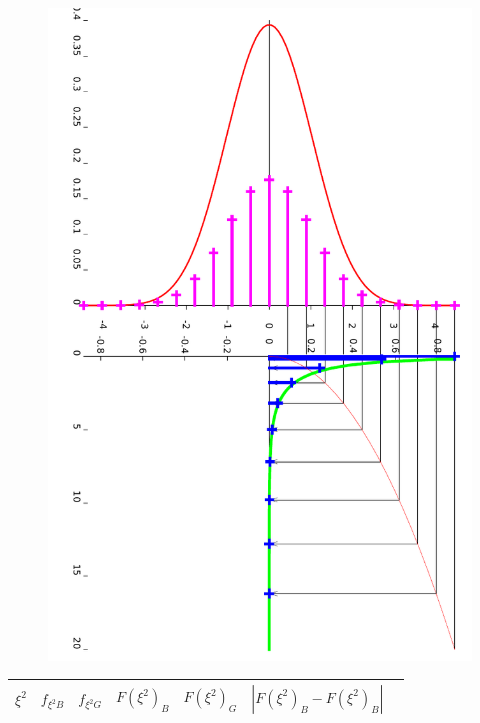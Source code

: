 \documentclass[a4paper,12pt]{article}
\begin{document}
\begin{figure}[h!]
\centering
\includegraphics[angle=90, width=\textwidth]{plot.pdf}
\end{figure}



\begin{longtable}{|c|c|c|c|c|c|c|}
\hline
$\xi^2$ & $f_{\xi^2B}$ & $f_{\xi^2G}$ & $F(\xi^2)_B$ & $F(\xi^2)_G$ & $|F(\xi^2)_B-F(\xi^2)_B|$ \\
\hline

\hline
\end{longtable}
\end{document}
